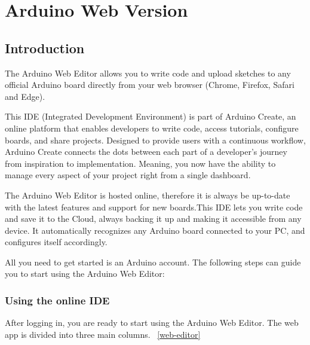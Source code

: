 \chapter {Arduino Web Version}

\section{Introduction}


The Arduino Web Editor allows you to write code and upload sketches to any official Arduino board directly from your web browser (Chrome, Firefox, Safari and Edge). \cite{arduinoWebEditor:2024}

This IDE (Integrated Development Environment) is part of Arduino Create, an online platform that enables developers to write code, access tutorials, configure boards, and share projects. Designed to provide users with a continuous workflow, Arduino Create connects the dots between each part of a developer's journey from inspiration to implementation. Meaning, you now have the ability to manage every aspect of your project right from a single dashboard.

The Arduino Web Editor is hosted online, therefore it is always be up-to-date with the latest features and support for new boards.This IDE lets you write code and save it to the Cloud, always backing it up and making it accessible from any device. It automatically recognizes any Arduino board connected to your PC, and configures itself accordingly.

All you need to get started is an Arduino account. The following steps can guide you to start using the Arduino Web Editor: \cite{arduinoWebEditor:2024}

\subsection{Using the online IDE}
After logging in, you are ready to start using the Arduino Web Editor. The web app is divided into three main columns. ~\ref{web-editor}

